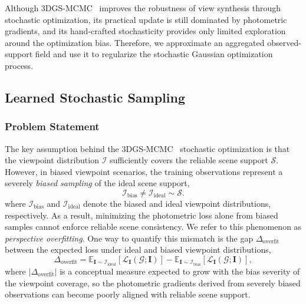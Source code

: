 \documentclass[lettersize,journal]{IEEEtran}
\begin{document}
Although 3DGS-MCMC~\cite{mcmc} improves the robustness of view synthesis through stochastic optimization, its practical update is still dominated by photometric gradients, and its hand-crafted stochasticity provides only limited exploration around the optimization bias. 
Therefore, we approximate an aggregated observed-support field and use it to regularize the stochastic Gaussian optimization process. 

\subsection{Learned Stochastic Sampling}

\subsubsection{Problem Statement}

The key assumption behind the 3DGS-MCMC~\cite{mcmc} stochastic optimization is that the viewpoint distribution $\mathcal{I}$ sufficiently covers the reliable scene support $\mathcal{S}$. However, in biased viewpoint scenarios, the training observations represent a severely \emph{biased sampling} of the ideal scene support,
\begin{equation}
    \mathcal{I}_{\text{bias}} \neq \mathcal{I}_{\text{ideal}} \sim \mathcal{S}.
    \label{eq5}
\end{equation}
where $\mathcal{I}_{\text{bias}}$ and $\mathcal{I}_{\text{ideal}}$ denote the biased and ideal viewpoint distributions, respectively.
As a result, minimizing the photometric loss alone from biased samples cannot enforce reliable scene consistency. We refer to this phenomenon as \emph{perspective overfitting}. One way to quantify this mismatch is the gap $\Delta_{\text{overfit}}$ between the expected loss under ideal and biased viewpoint distributions,
\begin{equation}
    \Delta_{\text{overfit}} = \mathbb{E}_{\mathbf{I} \sim \mathcal{I}_{\text{ideal}}} \left[ \mathcal{L}_{\mathbf{I}} (\mathcal{G}; \mathbf{I}) \right] - \mathbb{E}_{\mathbf{I} \sim \mathcal{I}_{\text{bias}}} \left[ \mathcal{L}_{\mathbf{I}} (\mathcal{G}; \mathbf{I}) \right],
    \label{eq5.1}
\end{equation}
where $\vert \Delta_{\text{overfit}} \vert$ is a conceptual measure expected to grow with the bias severity of the viewpoint coverage, so the photometric gradients derived from severely biased observations can become poorly aligned with reliable scene support.
\end{document}
